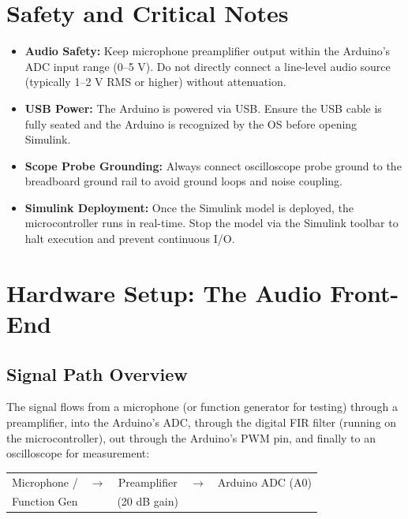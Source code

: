 \documentclass[11pt,letterpaper]{article}
\begin{document}
\clearpage

\section{Safety and Critical Notes}

\begin{itemize}
    \item \textbf{Audio Safety:} Keep microphone preamplifier output within the Arduino's ADC input range (0--5 V). Do not directly connect a line-level audio source (typically 1--2 V RMS or higher) without attenuation.
    \item \textbf{USB Power:} The Arduino is powered via USB. Ensure the USB cable is fully seated and the Arduino is recognized by the OS before opening Simulink.
    \item \textbf{Scope Probe Grounding:} Always connect oscilloscope probe ground to the breadboard ground rail to avoid ground loops and noise coupling.
    \item \textbf{Simulink Deployment:} Once the Simulink model is deployed, the microcontroller runs in real-time. Stop the model via the Simulink toolbar to halt execution and prevent continuous I/O.
\end{itemize}

\clearpage

\section{Hardware Setup: The Audio Front-End}

\subsection{Signal Path Overview}

The signal flows from a microphone (or function generator for testing) through a preamplifier, into the Arduino's ADC, through the digital FIR filter (running on the microcontroller), out through the Arduino's PWM pin, and finally to an oscilloscope for measurement:

\vspace{0.2in}
\noindent
\begin{tabular}{ccccc}
Microphone / & $\to$ & Preamplifier & $\to$ & Arduino ADC (A0) \\
Function Gen &  & (20 dB gain) &  &  \\
\end{tabular}
\end{document}
